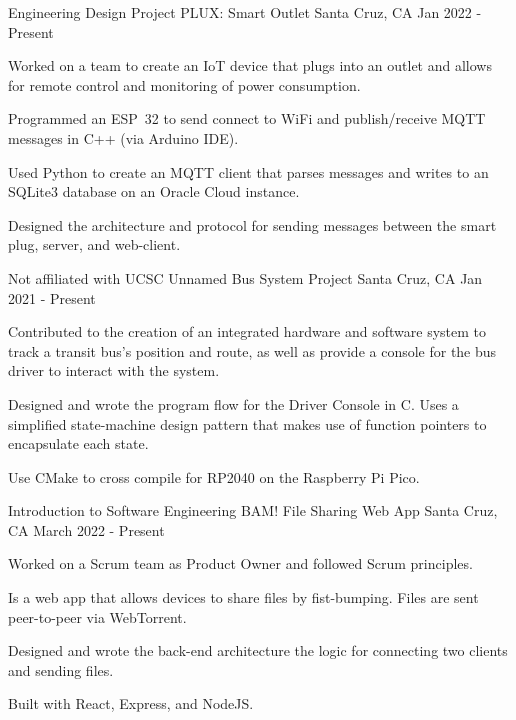 \begin{cventries}
  \cventry
    {Engineering Design Project} %
    {PLUX: Smart Outlet} %
    {Santa Cruz, CA} %
    {Jan 2022 - Present} %
    {
      \begin{cvitems} %
        \item {Worked on a team to create an IoT device that plugs into an outlet and allows for remote control and monitoring of power consumption.}
        \item {Programmed an ESP~32 to send connect to WiFi and publish/receive MQTT messages in C++ (via Arduino IDE).}
        \item {Used Python to create an MQTT client that parses messages and writes to an SQLite3 database on an Oracle Cloud instance.}
        \item {Designed the architecture and protocol for sending messages between the smart plug, server, and web-client.}
      \end{cvitems}
    }

  \cventry
    {Not affiliated with UCSC} %
    {Unnamed Bus System Project} %
    {Santa Cruz, CA} %
    {Jan 2021 - Present} %
    {
      \begin{cvitems} %
      	\item {Contributed to the creation of an integrated hardware and software system to track a transit bus's position and  route, as well as provide a console for the bus driver to interact with the system.}
      	\item {Designed and wrote the program flow for the Driver Console in C. Uses a simplified state-machine design pattern that makes use of function pointers to encapsulate each state.}
      	\item {Use CMake to cross compile for RP2040 on the Raspberry Pi Pico.}
      \end{cvitems}
    }
    
  \cventry
    {Introduction to Software Engineering}
    {BAM! File Sharing Web App}
    {Santa Cruz, CA}
    {March 2022 - Present}
    {
        \begin{cvitems}
            \item {Worked on a Scrum team as Product Owner and followed Scrum principles.}
            \item {Is a web app that allows devices to share files by fist-bumping. Files are sent peer-to-peer via WebTorrent.}
            \item {Designed and wrote the back-end architecture the logic for connecting two clients and sending files.}
            \item {Built with React, Express, and NodeJS.}
        \end{cvitems}
    }

\end{cventries}
